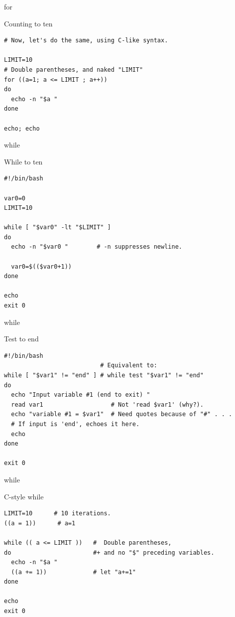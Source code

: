 \documentclass[xcolor=dvipsnames, 10pt, presentation,aspectratio=169]{beamer}
\begin{document}
\begin{frame}[label={sec:orgb085198},fragile]{for}
 \begin{block}{Counting to ten}
\begin{verbatim}
# Now, let's do the same, using C-like syntax.

LIMIT=10
# Double parentheses, and naked "LIMIT"
for ((a=1; a <= LIMIT ; a++))
do
  echo -n "$a "
done

echo; echo
\end{verbatim}
\end{block}
\end{frame}
\begin{frame}[label={sec:org08060e2},fragile]{while}
 \begin{block}{While to ten}
\begin{verbatim}
#!/bin/bash

var0=0
LIMIT=10

while [ "$var0" -lt "$LIMIT" ]
do
  echo -n "$var0 "        # -n suppresses newline.

  var0=$(($var0+1))
done

echo
exit 0
\end{verbatim}
\end{block}
\end{frame}
\begin{frame}[label={sec:orgc48139c},fragile]{while}
 \begin{block}{Test to end}
\begin{verbatim}
#!/bin/bash
                           # Equivalent to:
while [ "$var1" != "end" ] # while test "$var1" != "end"
do
  echo "Input variable #1 (end to exit) "
  read var1                   # Not 'read $var1' (why?).
  echo "variable #1 = $var1"  # Need quotes because of "#" . . .
  # If input is 'end', echoes it here.
  echo
done  

exit 0
\end{verbatim}
\end{block}
\end{frame}
\begin{frame}[label={sec:org84bf145},fragile]{while}
 \begin{block}{C-style while}
\begin{verbatim}
LIMIT=10      # 10 iterations.
((a = 1))      # a=1

while (( a <= LIMIT ))   #  Double parentheses,
do                       #+ and no "$" preceding variables.
  echo -n "$a "
  ((a += 1))             # let "a+=1"
done

echo
exit 0
\end{verbatim}
\end{block}
\end{frame}
\end{document}
